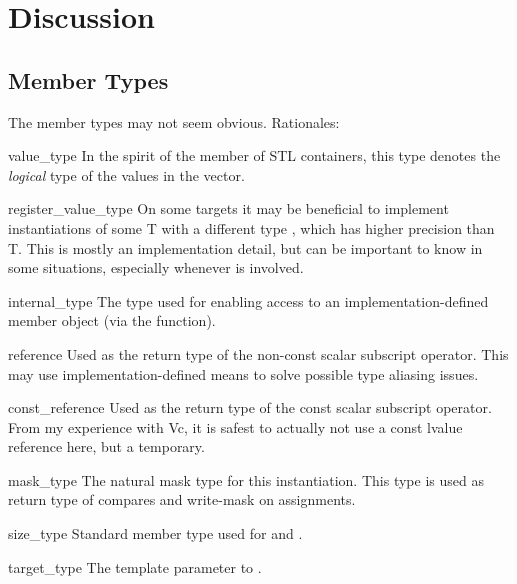 \section{Discussion}

\subsection{Member Types}
The member types may not seem obvious.
Rationales:
\begin{typelist*}
  \item[value_type]
    In the spirit of the  member of STL containers, this type denotes the \emph{logical} type of the values in the vector.

  \item[register_value_type]
    On some targets it may be beneficial to implement \datapar instantiations of some \type T with a different type , which has higher precision than \type T.
    This is mostly an implementation detail, but can be important to know in some situations, especially whenever  is involved.

  \item[internal_type]
    The type used for enabling access to an implementation-defined member object (via the  function).

  \item[reference]
    Used as the return type of the non-const scalar subscript operator.
    This may use implementation-defined means to solve possible type aliasing issues.

  \item[const_reference]
    Used as the return type of the const scalar subscript operator.
    From my experience with Vc, it is safest to actually not use a const lvalue reference here, but a temporary.

  \item[mask_type]
    The natural mask type for this \datapar instantiation.
    This type is used as return type of compares and write-mask on assignments.

  \item[size_type]
    Standard member type used for  and .

  \item[target_type]
    The  template parameter to \datapar.

\end{typelist*}

